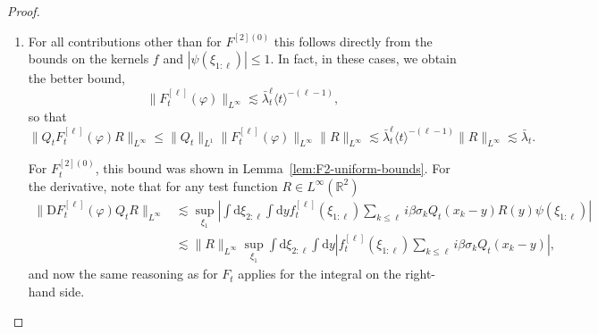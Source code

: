 \documentclass[11pt, a4paper]{scrartcl}
\numberwithin{equation}{section}
\theoremstyle{plain}
\theoremstyle{remark}
\newcommand{\mathD}{\mathrm{D}}
\newcommand{\mathd}{\mathrm{d}}
\newenvironment{enumeratealpha}{\begin{enumerate}[a{\textup{)}}] }{\end{enumerate}}
\begin{document}
\begin{proof}

	\begin{enumeratealpha}
		\item For all contributions other than for $F^{[2] (0)}$ this follows
		directly from the bounds on the kernels $f$ and $| \psi (\xi_{1 : \ell}) |
			\leqslant 1$. In fact, in these cases, we obtain the better bound,
		\[ \| F_t^{[\ell]} (\varphi) \|_{L^{\infty}} \lesssim \bar{\lambda}_t^{\ell}
			\langle t \rangle^{- (\ell - 1)}, \]
		so that
		\[ \| Q_t F_t^{[\ell]} (\varphi) R \|_{L^{\infty}} \leqslant \| Q_t
			\|_{L^1} \| F^{[\ell]}_t (\varphi) \|_{L^{\infty}} \| R \|_{L^{\infty}}
			\lesssim \bar{\lambda}_t^{\ell} \langle t \rangle^{- (\ell - 1)} \| R
			\|_{L^{\infty}} \lesssim \bar{\lambda}_t . \]


		For $F^{[2] (0)}_t$, this bound was shown in
		Lemma~\ref{lem:F2-uniform-bounds}. For the derivative, note that for any
		test function $R \in L^{\infty} (\mathbb{R}^2)$
		\[ \begin{aligned}
				\| \mathD F^{[\ell]}_t (\varphi) Q_t R \|_{L^{\infty}} & \lesssim
				\sup_{\xi_1} \left| \int \mathd \xi_{2 : \ell} \int \mathd
				yf^{[\ell]}_t (\xi_{1 : \ell}) \sum_{k \leqslant \ell} i \beta
				\sigma_k Q_t (x_k - y) R (y) \psi (\xi_{1 : \ell}) \right|                                                                \\
				                                                       & \lesssim  \| R \|_{L^{\infty}} \sup_{\xi_1} \int \mathd \xi_{2 :
					\ell} \int \mathd y \left| f^{[\ell]}_t (\xi_{1 : \ell}) \sum_{k
					\leqslant \ell} i \beta \sigma_k Q_t (x_k - y) \right|,
			\end{aligned} \]
		and now the same reasoning as for $F_t$ applies for the integral on the
		right-hand side.


\end{enumeratealpha}
\end{proof}
\end{document}
